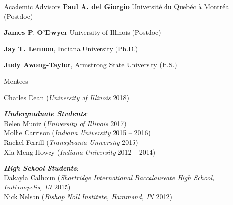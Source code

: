 \documentclass{resume} %
\begin{document}

\begin{rSection}{Academic Advisors}
  {\bf Paul A. del Giorgio} Universit\'{e} du Queb\'{e}c \`{a} Montr\'{e}a (Postdoc)

  {\bf James P. O'Dwyer} University of Illinois (Postdoc)

  {\bf Jay T. Lennon}, Indiana University (Ph.D.)

  {\bf Judy Awong-Taylor}, Armstrong State University (B.S.)

\end{rSection}


\begin{rSection}{Mentees}

    Charles Dean ({\em University of Illinois} 2018)

  {\bf \em Undergraduate Students}: \\
    Belen Muniz ({\em University of Illinois} 2017)\\
    Mollie Carrison ({\em Indiana University} 2015 -- 2016)\\
    Rachel Ferrill ({\em Transylvania University} 2015) \\
    Xia Meng Howey ({\em Indiana University} 2012 -- 2014)

  {\bf \em High School Students}: \\
    Dakayla Calhoun ({\em Shortridge International Baccalaureate High
    School, Indianapolis, IN} 2015)\\
    Nick Nelson ({\em Bishop Noll Institute, Hammond, IN} 2012)

\end{rSection}
\end{document}
